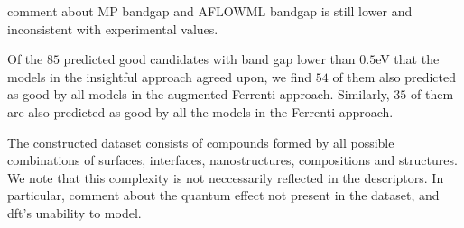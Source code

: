 comment about MP bandgap and AFLOWML bandgap is still lower and inconsistent with experimental values.

Of the $85$ predicted good candidates with band gap lower than $0.5$eV that the models in the insightful approach agreed upon, we find $54$ of them also predicted as good by all models in the augmented Ferrenti approach. Similarly, $35$ of them are also predicted as good by all the models in the Ferrenti approach.

The constructed dataset consists of compounds formed by all possible combinations of surfaces, interfaces, nanostructures, compositions and structures. We note that this complexity is not neccessarily reflected in the descriptors. In particular, comment about the quantum effect not present in the dataset, and dft's unability to model.
